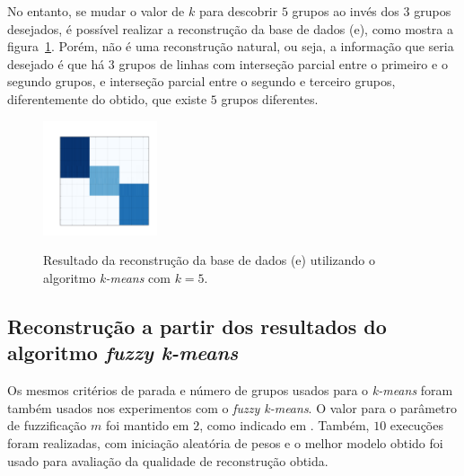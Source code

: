 \documentclass[
    12pt,                %
    oneside,            %
    a4paper,            %
    english,            %
    brazil                %
    ]{abntex2ppgsi}
\begin{document}
No entanto, se mudar o valor de $k$ para descobrir $5$ grupos ao invés dos $3$ grupos desejados, é possível realizar a reconstrução da base de dados (e), como mostra a figura~\ref{fig:reconstruction-2:kmeans}.
Porém, não é uma reconstrução natural, ou seja, a informação que seria desejado é que há $3$ grupos de linhas com interseção parcial entre o primeiro e o segundo grupos, e interseção parcial entre o segundo e terceiro grupos, diferentemente do obtido, que existe $5$ grupos diferentes.

\begin{figure}[H]
\centering
    \caption{Resultado da reconstrução da base de dados (e) utilizando o algoritmo \textit{k-means} com $k = 5$.}
    \includegraphics[width=0.3\textwidth]{img/e-reconstruction-2-kmeans.png}
    \label{fig:reconstruction-2:kmeans}
\end{figure}

\subsection{Reconstrução a partir dos resultados do algoritmo \textit{fuzzy k-means}}
\label{subsec:results-reconstruction-fkmeans}

Os mesmos critérios de parada e número de grupos usados para o \textit{k-means} foram também usados nos experimentos com o \textit{fuzzy k-means}.
O valor para o parâmetro de fuzzificação $m$ foi mantido em $2$, como indicado em .
Também, $10$ execuções foram realizadas, com iniciação aleatória de pesos e o melhor modelo obtido foi usado para avaliação da qualidade de reconstrução obtida.

\end{document}
